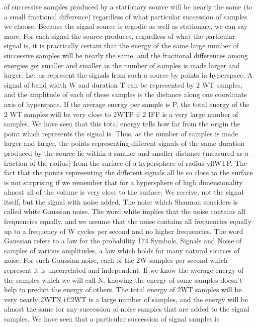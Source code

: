 {{{{{{{{{{of successive samples produced by a stationary source will be
nearly the same (to a small fractional difference) regardless of what
particular succession of samples we choose.
Because the signal source is ergodic as well as stationary, we can
say more. For each signal the source produces, regardless of what
the particular signal is, it is practically certain that the energy of
the same large number of successive samples will be nearly the
same, and the fractional differences among energies get smaller
and smaller as the number of samples is made larger and larger.
Let us represent the signals from such a source by points in
hyperspace. A signal of band width W and duration T can be
represented by 2 WT samples, and the amplitude of each of these
samples is the distance along one coordinate axis of hyperspace.
If the average energy per sample is P, the total energy of the 2 WT
samples will be very close to 2WTP if 2 IFF is a very large number
of samples. We have seen that this total energy tells how far from
the origin the point which represents the signal is. Thus, as the
number of samples is made larger and larger, the points representing
different signals of the same duration produced by the source
lie within a smaller and smaller distance (measured as a fraction
of the radius) from the surface of a hypersphere of radius yflWTP.
The fact that the points representing the different signals all lie so
close to the surface is not surprising if we remember that for a
hypersphere of high dimensionality almost all of the volume is very
close to the surface.
We receive, not the signal itself, but the signal with noise added.
The noise which Shannon considers is called white Gaussian noise.
The word white implies that the noise contains all frequencies
equally, and we assume that the noise contains all frequencies
equally up to a frequency of W cycles per second and no higher
frequencies. The word Gaussian refers to a law for the probability
174
Symbols,
Signals and Noise
of samples of various amplitudes, a law which holds for many
natural sources of noise. For such Gaussian noise, each of the 2W
samples per second which represent it is uncorrelated and independent.
If we know the average energy of the samples which we
will call N, knowing the energy of some samples doesn’t help to
predict the energy of others. The total energy of 2WT samples will
be very nearly 2WTN i£2WT is a large number of samples, and
the energy will be almost the same for any succession of noise
samples that are added to the signal samples.
We have seen that a particular succession of signal samples is
}}}}}}}}}}
